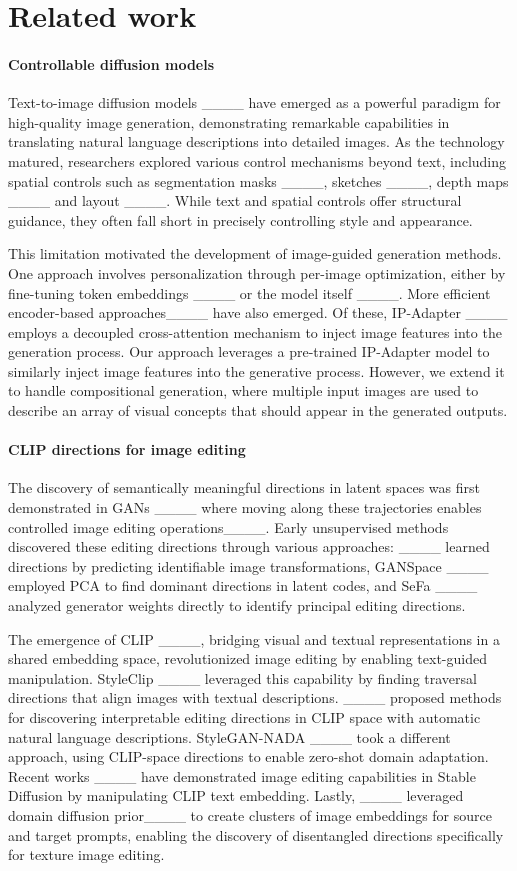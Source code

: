 \section{Related work}
\paragraph{\textbf{Controllable diffusion models}}
Text-to-image diffusion models ____ have emerged as a powerful paradigm for high-quality image generation, demonstrating remarkable capabilities in translating natural language descriptions into detailed images. As the technology matured, researchers explored various control mechanisms beyond text, including spatial controls such as segmentation masks ____, sketches ____, depth maps ____ and layout ____. While text and spatial controls offer structural guidance, they often fall short in precisely controlling style and appearance. 

This limitation motivated the development of image-guided generation methods. 
One approach involves personalization through per-image optimization, either by fine-tuning token embeddings ____ or the model itself ____. More efficient encoder-based approaches____ have also emerged. Of these, IP-Adapter ____ employs a decoupled cross-attention mechanism to inject image features into the generation process. Our approach leverages a pre-trained IP-Adapter model to similarly inject image features into the generative process. However, we extend it to handle compositional generation, where multiple input images are used to describe an array of visual concepts that should appear in the generated outputs.

\paragraph{\textbf{CLIP directions for image editing}}
The discovery of semantically meaningful directions in latent spaces was first demonstrated in GANs ____ where moving along these trajectories enables controlled image editing operations____. Early unsupervised methods discovered these editing directions through various approaches: ____ learned directions by predicting identifiable image transformations, GANSpace ____ employed PCA to find dominant directions in latent codes, and SeFa ____ analyzed generator weights directly to identify principal editing directions. 

The emergence of CLIP ____, bridging visual and textual representations in a shared embedding space, revolutionized image editing by enabling text-guided manipulation. StyleClip ____ leveraged this capability by finding traversal directions that align images with textual descriptions. ____ proposed methods for discovering interpretable editing directions in CLIP space with automatic natural language descriptions. StyleGAN-NADA ____ took a different approach, using CLIP-space directions to enable zero-shot domain adaptation. 
Recent works ____ have demonstrated image editing capabilities in Stable Diffusion by manipulating CLIP text embedding.
Lastly, ____ leveraged domain diffusion prior____ to create clusters of image embeddings for source and target prompts, enabling the discovery of disentangled directions specifically for texture image editing.

